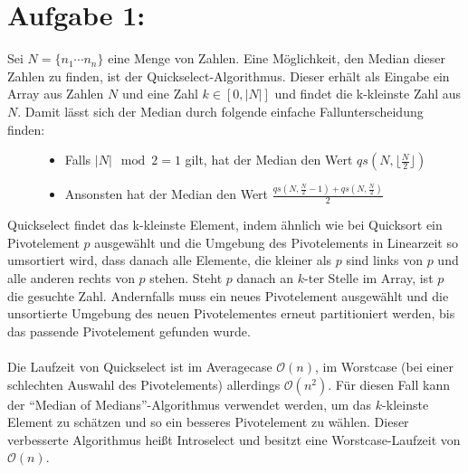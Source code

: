 \section*{Aufgabe 1: }
Sei $N = \{n_1 \cdots n_n\}$ eine Menge von Zahlen. Eine Möglichkeit, den Median dieser Zahlen zu finden, ist der Quickselect-Algorithmus. Dieser erhält als Eingabe ein Array aus Zahlen $N$ und eine Zahl $k\in [0, |N|]$ und findet die k-kleinste Zahl aus $N$. Damit lässt sich der Median durch folgende einfache Fallunterscheidung finden:
\begin{center}
  \begin{figure}[H]
    \begin{itemize}
    \item Falls $|N| \mod 2 = 1$ gilt, hat der Median den Wert $qs(N, \lfloor \frac{N}{2} \rfloor)$
    \item Ansonsten hat der Median den Wert $\frac{qs(N, \frac{N}{2}-1) + qs(N, \frac{N}{2})}{2}$
    \end{itemize}
  \end{figure}
\end{center}
Quickselect findet das k-kleinste Element, indem ähnlich wie bei Quicksort ein Pivotelement $p$ ausgewählt und die Umgebung des Pivotelements in Linearzeit so umsortiert wird, dass danach alle Elemente, die kleiner als $p$ sind links von $p$ und alle anderen rechts von $p$ stehen. Steht $p$ danach an $k$-ter Stelle im Array, ist $p$ die gesuchte Zahl. Andernfalls muss ein neues Pivotelement ausgewählt und die unsortierte Umgebung des neuen Pivotelementes erneut partitioniert werden, bis das passende Pivotelement gefunden wurde.\\\\
Die Laufzeit von Quickselect ist im Averagecase $\mathcal{O}(n)$, im Worstcase (bei einer schlechten Auswahl des Pivotelements) allerdings $\mathcal{O}(n^2)$. Für diesen Fall kann der ``Median of Medians''-Algorithmus verwendet werden, um das $k$-kleinste Element zu schätzen und so ein besseres Pivotelement zu wählen.
Dieser verbesserte Algorithmus heißt Introselect und besitzt eine Worstcase-Laufzeit von $\mathcal{O}(n)$.